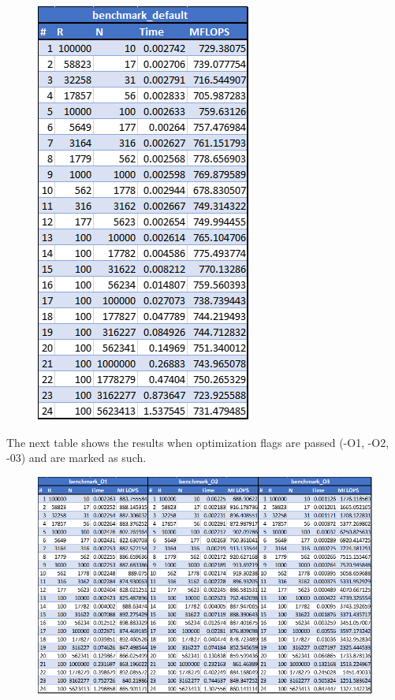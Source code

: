 \documentclass[a4paper, 11pt]{article}
\begin{document}
\begin{figure}[H]
	\centering
	\includegraphics[scale=.75]{vt_base.png}
\end{figure}

The next table shows the results when optimization flags are passed (-O1, -O2, -03) and are marked as such.

\begin{figure}[H]
	\centering
	\includegraphics[width=6in]{vt_opt.png}
\end{figure}
\end{document}
